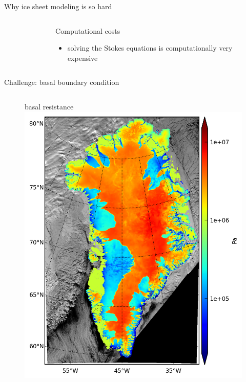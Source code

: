 \documentclass[hide notes,intlimits,unknownkeysallowed]{beamer}
\begin{document}
\begin{frame}{Why ice sheet modeling is so hard}
\begin{columns}[c]
\begin{column}{.3\linewidth}
\begin{figure}
        \end{figure}
      \end{column}
      \begin{column}{.67\linewidth}
        \begin{block}{Computational costs}
        \begin{itemize}
        \item solving the Stokes equations is computationally very expensive
        \end{itemize}
      \end{block}
      \end{column}
    \end{columns}
\end{frame}


\begin{frame}{Challenge: basal boundary condition}
  \begin{columns}[c]
    \begin{column}{.45\linewidth}
      \begin{figure}
        \scriptsize{basal resistance} \\
        \includegraphics[width=\textwidth]{tauc}

\end{figure}
\end{column}
\end{columns}
\end{frame}
\end{document}
